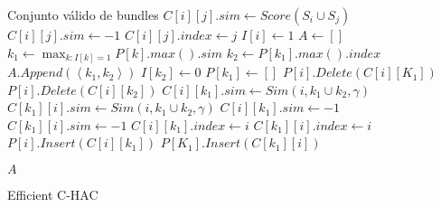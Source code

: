 \begin{algorithm}[H]
\begin{algorithmic}[1]
\ENSURE Conjunto válido de bundles
			\STATE $C[i][j].sim \leftarrow Score(S_i \cup S_j)$
		\ELSE
			\STATE $C[i][j].sim \leftarrow -1$
		\ENDIF
		\STATE $C[i][j].index \leftarrow j$
	\ENDFOR
	\STATE $I[i] \leftarrow 1$
\ENDFOR
\STATE $A \leftarrow []$
	\STATE $k_1 \leftarrow \max_{k:I[k]=1}{P[k].max().sim}$
		\BREAK
	\ENDIF
	\STATE $k_2 \leftarrow P[k_1].max().index$
	\STATE $A.Append(\left\langle k_1,k_2 \right\rangle)$
	\STATE $I[k_2] \leftarrow 0$
	\STATE $P[k_1] \leftarrow []$
		\STATE $P[i].Delete(C[i][K_1])$
		\STATE $P[i].Delete(C[i][k_2])$
			\STATE $C[i][k_1].sim \leftarrow Sim(i,k_1 \cup k_2,\gamma)$
			\STATE $C[k_1][i].sim \leftarrow Sim(i,k_1 \cup k_2,\gamma)$
		\ELSE
			\STATE $C[i][k_1].sim \leftarrow -1$
			\STATE $C[k_1][i].sim \leftarrow -1$
		\ENDIF
		\STATE $C[i][k_1].index \leftarrow i$
		\STATE $C[k_1][i].index \leftarrow i$		
		\STATE $P[i].Insert(C[i][k_1])$
		\STATE $P[K_1].Insert(C[k_1][i])$		
	\ENDFOR
\ENDFOR

\RETURN $A$
\end{algorithmic}
\caption{Efficient C-HAC}\label{alg:Efficient C-HAC}
\end{algorithm}

